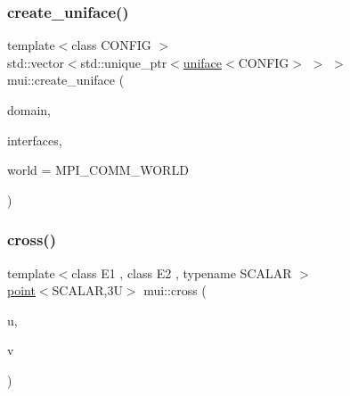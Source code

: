 \mbox{\label{namespacemui_ab54f20289cc2f21630056ddd48782822}} 
\subsubsection{\texorpdfstring{create\+\_\+uniface()}{create\_uniface()}}
{\footnotesize\ttfamily template$<$class C\+O\+N\+F\+IG $>$ \\
std\+::vector$<$std\+::unique\+\_\+ptr$<$\hyperlink{classmui_1_1uniface}{uniface}$<$C\+O\+N\+F\+IG$>$ $>$ $>$ mui\+::create\+\_\+uniface (\begin{DoxyParamCaption}\item[{std\+::string}]{domain,  }\item[{std\+::vector$<$ std\+::string $>$}]{interfaces,  }\item[{M\+P\+I\+\_\+\+Comm}]{world = {\ttfamily MPI\+\_\+COMM\+\_\+WORLD} }\end{DoxyParamCaption})\hspace{0.3cm}{\ttfamily [inline]}}

\mbox{\label{namespacemui_a664a9f3cb822813be2e0bb609f1ba082}} 
\subsubsection{\texorpdfstring{cross()}{cross()}}
{\footnotesize\ttfamily template$<$class E1 , class E2 , typename S\+C\+A\+L\+AR $>$ \\
\hyperlink{structmui_1_1point}{point}$<$S\+C\+A\+L\+AR,3\+U$>$ mui\+::cross (\begin{DoxyParamCaption}\item[{\hyperlink{structmui_1_1vexpr}{vexpr}$<$ E1, S\+C\+A\+L\+AR, 3\+U $>$ const \&}]{u,  }\item[{\hyperlink{structmui_1_1vexpr}{vexpr}$<$ E2, S\+C\+A\+L\+AR, 3\+U $>$ const \&}]{v }\end{DoxyParamCaption})\hspace{0.3cm}{\ttfamily [inline]}}

\mbox{\label{namespacemui_a0a094bed72df9ad9beec2db0706a85ad}} 
